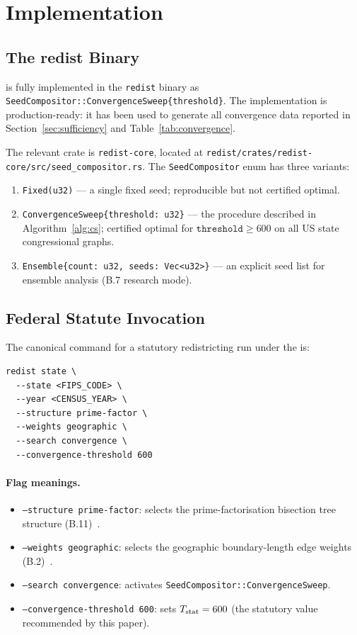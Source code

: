 \section{Implementation}
\label{sec:implementation}

\subsection{The redist Binary}

\cs{} is fully implemented in the \texttt{redist} binary as
\texttt{SeedCompositor::ConvergenceSweep\{threshold\}}.
The implementation is production-ready: it has been used to generate all
convergence data reported in Section~\ref{sec:sufficiency} and Table~\ref{tab:convergence}.

The relevant crate is \texttt{redist-core}, located at
\texttt{redist/crates/redist-core/src/seed\_compositor.rs}.
The \texttt{SeedCompositor} enum has three variants:

\begin{enumerate}
\item \texttt{Fixed(u32)} --- a single fixed seed; reproducible but not
      certified optimal.
\item \texttt{ConvergenceSweep\{threshold: u32\}} --- the \cs{} procedure
      described in Algorithm~\ref{alg:cs}; certified optimal for
      $\texttt{threshold} \ge 600$ on all US state congressional graphs.
\item \texttt{Ensemble\{count: u32, seeds: Vec<u32>\}} --- an explicit seed
      list for ensemble analysis (B.7 research mode).
\end{enumerate}

\subsection{Federal Statute Invocation}

The canonical command for a statutory redistricting run under the \dia{}
is:

\begin{verbatim}
redist state \
  --state <FIPS_CODE> \
  --year <CENSUS_YEAR> \
  --structure prime-factor \
  --weights geographic \
  --search convergence \
  --convergence-threshold 600
\end{verbatim}

\paragraph{Flag meanings.}
\begin{itemize}
\item \texttt{--structure prime-factor}: selects the \ar{} prime-factorisation
      bisection tree structure (B.11)~\citep{b11paper}.
\item \texttt{--weights geographic}: selects the geographic boundary-length
      edge weights (B.2)~\citep{b2paper}.
\item \texttt{--search convergence}: activates \texttt{SeedCompositor::ConvergenceSweep}.
\item \texttt{--convergence-threshold 600}: sets $T_{\mathrm{stat}} = 600$ (the statutory
      value recommended by this paper).
\end{itemize}

